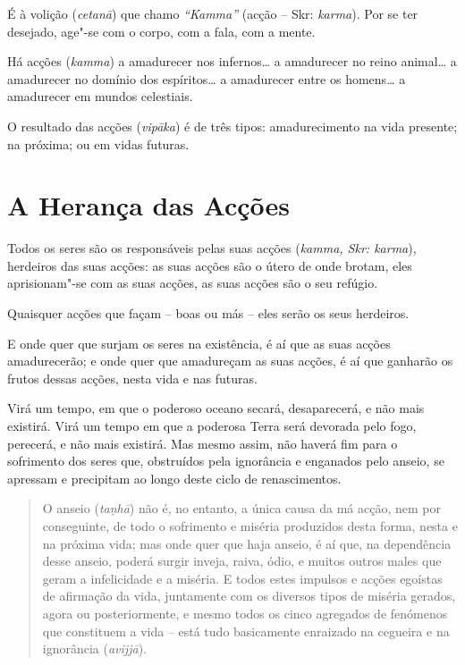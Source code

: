 É à volição (\emph{cetanā}) que chamo \emph{“Kamma”} (acção -- Skr: \emph{karma}). Por se ter
desejado, age"-se com o corpo, com a fala, com a mente.

Há acções (\emph{kamma}) a amadurecer nos infernos\ldots{} a amadurecer no reino
animal\ldots{} a amadurecer no domínio dos espíritos\ldots{} a amadurecer entre
os homens\ldots{} a amadurecer em mundos celestiais.

O resultado das acções (\emph{vipāka}) é de três tipos: amadurecimento na vida
presente; na próxima; ou em vidas futuras.


\section{A Herança das Acções}

Todos os seres são os responsáveis pelas suas acções (\emph{kamma, Skr: karma}),
herdeiros das suas acções: as suas acções são o útero de onde brotam, eles
aprisionam"-se com as suas acções, as suas acções são o seu refúgio.

Quaisquer acções que façam -- boas ou más -- eles serão os seus herdeiros.


E onde quer que surjam os seres na existência, é aí que as suas acções
amadurecerão; e onde quer que amadureçam as suas acções, é aí que ganharão os
frutos dessas acções, nesta vida e nas futuras.


Virá um tempo, em que o poderoso oceano secará, desaparecerá, e não mais
existirá. Virá um tempo em que a poderosa Terra será devorada pelo fogo,
perecerá, e não mais existirá. Mas mesmo assim, não haverá fim para o sofrimento
dos seres que, obstruídos pela ignorância e enganados pelo anseio, se apressam
e precipitam ao longo deste ciclo de renascimentos.


\clearpage

\begin{quote}
  O anseio (\emph{ta\d{n}hā}) não é, no entanto, a única causa da má acção, nem por
  conseguinte, de todo o sofrimento e miséria produzidos desta forma, nesta e na
  próxima vida; mas onde quer que haja anseio, é aí que, na dependência desse
  anseio, poderá surgir inveja, raiva, ódio, e muitos outros males que geram a
  infelicidade e a miséria. E todos estes impulsos e acções egoístas de
  afirmação da vida, juntamente com os diversos tipos de miséria gerados, agora
  ou posteriormente, e mesmo todos os cinco agregados de fenómenos que
  constituem a vida -- está tudo basicamente enraizado na cegueira e na
  ignorância (\emph{avijjā}).
\end{quote}

